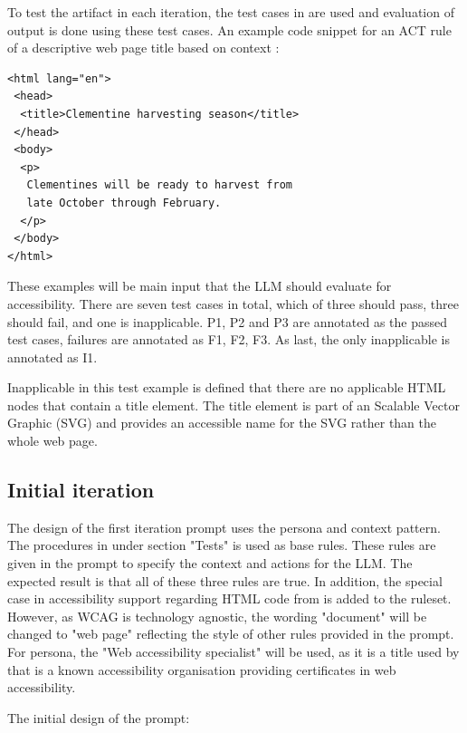 To test the artifact in each iteration, the test cases in \textcite{act_rule_g88} are used and evaluation of output is done using these test cases. An example code snippet for an ACT rule of a descriptive web page title based on context \citep{act_rule_g88}:

\begin{verbatim}
<html lang="en">
 <head>
  <title>Clementine harvesting season</title>
 </head>
 <body>
  <p>
   Clementines will be ready to harvest from 
   late October through February.
  </p>
 </body>
</html>
\end{verbatim}

These examples will be main input that the LLM should evaluate for accessibility. There are seven test cases in total, which of three should pass, three should fail, and one is inapplicable. P1, P2 and P3 are annotated as the passed test cases, failures are annotated as F1, F2, F3. As last, the only inapplicable is annotated as I1.

Inapplicable in this test example is defined that there are no applicable HTML nodes that contain a title element. The title element is part of an Scalable Vector Graphic (SVG) and provides an accessible name for the SVG rather than the whole web page.

\subsection{Initial iteration}

The design of the first iteration prompt uses the persona and context pattern. The procedures in \textcite{g88} under section "Tests" is used as base rules. These rules are given in the prompt to specify the context and actions for the LLM. The expected result is that all of these three rules are true. In addition, the special case in accessibility support regarding HTML code from \textcite{act_rule_g88} is added to the ruleset. However, as WCAG is technology agnostic, the wording "document" will be changed to "web page" reflecting the style of other rules provided in the prompt. For persona, the "Web accessibility specialist" will be used, as it is a title used by \textcite{web_accessibility_specialist} that is a known accessibility organisation providing certificates in web accessibility.

The initial design of the prompt:

